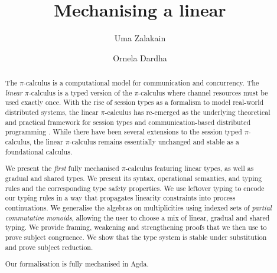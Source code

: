 \documentclass[a4paper,UKenglish,cleveref, autoref, thm-restate,authorcolumns]{lipics-v2019}
\title{Mechanising a linear \picalc}
\author{Uma Zalakain}{University of Glasgow, Scotland}
       {u.zalakain.1@research.gla.ac.uk}{https://orcid.org/0000-0002-3268-9338}{}
\author{Ornela Dardha}{University of Glasgow, Scotland}
       {ornela.dardha@glasgow.ac.uk}{https://orcid.org/0000-0001-9927-7875}{}
\theoremstyle{definition}
\newcommand{\picalc}{$\pi$-calculus}
\begin{document}
\maketitle

\begin{abstract}
  The \picalc{} is a computational model for communication and concurrency.
  The \emph{linear} \picalc{} is a typed version of the \picalc{} where channel resources must be used exactly once.
  With the rise of session types as a formalism to model real-world distributed systems, the linear \picalc{} has re-emerged as the underlying theoretical and practical framework for session types and communication-based distributed programming \cite{DardhaGS12,Padovani17,ScalasY16,ScalasDHY17}.
  While there have been several extensions to the session typed \picalc{}, the linear \picalc{} remains essentially unchanged and stable as a foundational calculus.

  We present the \emph{first} fully mechanised \picalc{} featuring linear types, as well as gradual and shared types.
  We present its syntax, operational semantics, and typing rules and the corresponding type safety properties.
  We use leftover typing \cite{Allais2018a} to encode our typing rules in a way that propagates linearity constraints into process continuations.
  We generalise the algebras on multiplicities using indexed sets of \emph{partial commutative monoids}, allowing the user to choose a mix of linear, gradual and shared typing.
  We provide framing, weakening and strengthening proofs that we then use to prove subject congruence.
  We show that the type system is stable under substitution and prove subject reduction.

  Our formalisation is fully mechanised in Agda. \cite{Zalakain2020Agda}
\end{abstract}

\end{document}
